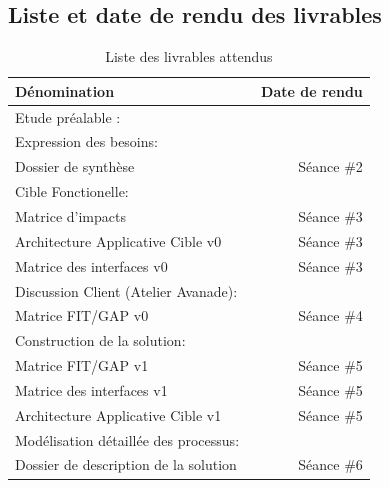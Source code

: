 \documentclass[]{scrartcl}
\begin{document}
\begin{itemize}
\subsection{Liste et date de rendu des livrables}
\begin{table}[h!]\centering
    \caption{Liste des livrables attendus}
    \begin{tabular}{l r}%
        \toprule
        \textbf{Dénomination} & \ \textbf{Date de rendu} \\%
        \midrule%
       Etude préalable :  & \\ \midrule
       \hspace{0.33cm} Expression des besoins:  & \\ 
       \hspace{0.66cm} Dossier de synthèse & Séance \#2\\
         \hspace{0.33cm}  Cible Fonctionelle: & \\
                \hspace{0.66cm} Matrice d'impacts & Séance \#3\\ 
       \hspace{0.66cm}  Architecture Applicative Cible v0& Séance \#3\\
       \hspace{0.66cm}  Matrice des interfaces v0 & Séance \#3\\ 
         \hspace{0.33cm}   Discussion Client (Atelier Avanade): & \\
                \hspace{0.66cm}  Matrice FIT/GAP v0& Séance \#4\\
         \hspace{0.33cm}   Construction de la solution: & \\
                \hspace{0.66cm} Matrice FIT/GAP v1& Séance \#5\\ 
       \hspace{0.66cm} Matrice des interfaces v1& Séance \#5\\
       \hspace{0.66cm}  Architecture Applicative Cible v1& Séance \#5\\ 
         \hspace{0.33cm}   Modélisation détaillée des processus: &\\
                \hspace{0.66cm}  Dossier de description de la solution&Séance \#6\\ 

\end{tabular}
\end{table}
\end{itemize}
\end{document}
